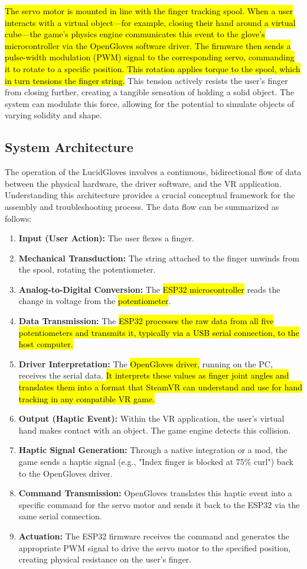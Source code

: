 \documentclass{article}
\begin{document}
\hl{The servo motor is mounted in line with the finger tracking spool. When a user interacts with a virtual object—for example, closing their hand around a virtual cube—the game's physics engine communicates this event to the glove's microcontroller via the OpenGloves software driver. The firmware then sends a pulse-width modulation (PWM) signal to the corresponding servo, commanding it to rotate to a specific position. This rotation applies torque to the spool, which in turn tensions the finger string.} This tension actively resists the user's finger from closing further, creating a tangible sensation of holding a solid object. The system can modulate this force, allowing for the potential to simulate objects of varying solidity and shape.

\subsection{System Architecture}
The operation of the LucidGloves involves a continuous, bidirectional flow of data between the physical hardware, the driver software, and the VR application. Understanding this architecture provides a crucial conceptual framework for the assembly and troubleshooting process. The data flow can be summarized as follows:
\begin{enumerate}
    \item \textbf{Input (User Action):} The user flexes a finger.
    \item \textbf{Mechanical Transduction:} The string attached to the finger unwinds from the spool, rotating the potentiometer.
    \item \textbf{Analog-to-Digital Conversion:} The \hl{ESP32 microcontroller} reads the change in voltage from the \hl{potentiometer}.
    \item \textbf{Data Transmission:} The \hl{ESP32 processes the raw data from all five potentiometers and transmits it, typically via a USB serial connection, to the host computer.}
    \item \textbf{Driver Interpretation:} The \hl{OpenGloves driver,} running on the PC, receives the serial data. \hl{It interprets these values as finger joint angles and translates them into a format that SteamVR can understand and use for hand tracking in any compatible VR game.}
    \item \textbf{Output (Haptic Event):} Within the VR application, the user's virtual hand makes contact with an object. The game engine detects this collision.
    \item \textbf{Haptic Signal Generation:} Through a native integration or a mod, the game sends a haptic signal (e.g., "Index finger is blocked at 75\% curl") back to the OpenGloves driver.
    \item \textbf{Command Transmission:} OpenGloves translates this haptic event into a specific command for the servo motor and sends it back to the ESP32 via the same serial connection.
    \item \textbf{Actuation:} The ESP32 firmware receives the command and generates the appropriate PWM signal to drive the servo motor to the specified position, creating physical resistance on the user's finger.
\end{enumerate}
\end{document}
